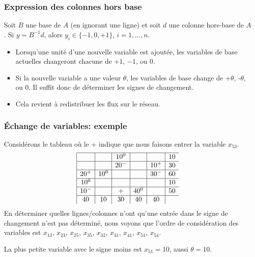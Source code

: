 \documentclass[usepdftitle=false]{beamer}
\begin{document}
\begin{frame}
\frametitle{Expression des colonnes hors base}

\begin{mltheorem}
Soit $B$ une base de $A$ (en ignorant une ligne) et soit $d$ une colonne hors-base de $A$.
Si $y = B^{-1}d$, alors $y_i \in \{ -1, 0, +1 \}$, $i = 1,\ldots,n$.
\end{mltheorem}

\begin{itemize}
	\item 
Lorsqu'une unité d'une nouvelle variable est ajoutée, les variables de base actuelles changeront chacune de $+1$, $-1$, ou $0$.
	\item 
Si la nouvelle variable a une valeur $\theta$, les variables de base
change de +$\theta$, -$\theta$, ou 0. Il suffit donc de déterminer les signes de
changement.
	\item 
Cela revient à redistribuer les flux sur le réseau.
\end{itemize}

\end{frame}

\begin{frame}
\frametitle{Échange de variables: exemple}

Considérons le tableau où le + indique que nous faisons entrer la variable $x_{53}$.
$$
	\begin{array}{|c|c|c|c|c|c}
		\hline
		& & 10^0 & & & 10 \\
		\hline
		& & 20^- & & 10^+ & 30 \\
		\hline
		20^+ & 10^0 & & & 30^- & 60 \\
		\hline
		10^0 & & & & & 10 \\
		\hline
        10^- & & + & 40^0 & & 50 \\
		\hline
		40 & 10 & 30 & 40 & 40 & \\
	\end{array}
$$
En déterminer quelles lignes/colonnes n'ont qu'une entrée dans le signe de changement n'est pas déterminé, nous voyons que l'ordre de considération des variables est $x_{13}$, $x_{23}$, $x_{25}$, $x_{35}$, $x_{32}$, $x_{31}$, $x_{41}$, $x_{51}$, $x_{54}$.

La plus petite variable avec le signe moins est $x_{51} = 10$, aussi $\theta = 10$.
\end{frame}
\end{document}
